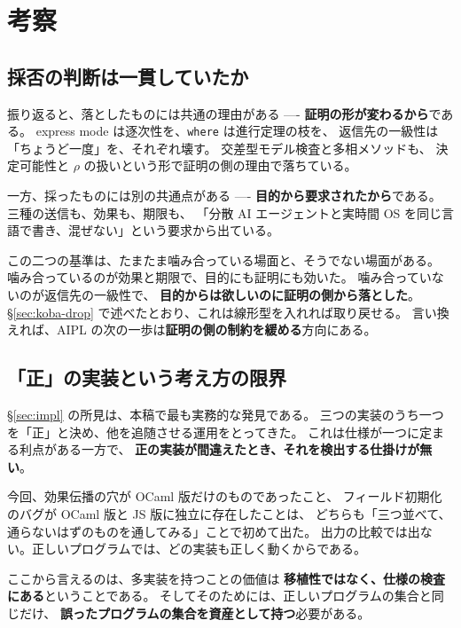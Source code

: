 \documentclass[11pt,a4paper]{ltjsarticle}
\theoremstyle{definition}
\theoremstyle{remark}
\begin{document}
\section{考察}
\label{sec:discuss}

\subsection{採否の判断は一貫していたか}

振り返ると、落としたものには共通の理由がある ----
\textbf{証明の形が変わるから}である。
express mode は逐次性を、\texttt{where} は進行定理の枝を、
返信先の一級性は「ちょうど一度」を、それぞれ壊す。
交差型モデル検査と多相メソッドも、
決定可能性と $\rho$ の扱いという形で証明の側の理由で落ちている。

一方、採ったものには別の共通点がある ----
\textbf{目的から要求されたから}である。
三種の送信も、効果も、期限も、
「分散 AI エージェントと実時間 OS を同じ言語で書き、混ぜない」という要求から出ている。

この二つの基準は、たまたま噛み合っている場面と、そうでない場面がある。
噛み合っているのが効果と期限で、目的にも証明にも効いた。
噛み合っていないのが返信先の一級性で、
\textbf{目的からは欲しいのに証明の側から落とした}。
\S\ref{sec:koba-drop} で述べたとおり、これは線形型を入れれば取り戻せる。
言い換えれば、AIPL の次の一歩は\textbf{証明の側の制約を緩める}方向にある。

\subsection{「正」の実装という考え方の限界}

\S\ref{sec:impl} の所見は、本稿で最も実務的な発見である。
三つの実装のうち一つを「正」と決め、他を追随させる運用をとってきた。
これは仕様が一つに定まる利点がある一方で、
\textbf{正の実装が間違えたとき、それを検出する仕掛けが無い}。

今回、効果伝播の穴が OCaml 版だけのものであったこと、
フィールド初期化のバグが OCaml 版と JS 版に独立に存在したことは、
どちらも「三つ並べて、通らないはずのものを通してみる」ことで初めて出た。
出力の比較では出ない。正しいプログラムでは、どの実装も正しく動くからである。

ここから言えるのは、多実装を持つことの価値は
\textbf{移植性ではなく、仕様の検査にある}ということである。
そしてそのためには、正しいプログラムの集合と同じだけ、
\textbf{誤ったプログラムの集合を資産として持つ}必要がある。
\end{document}
